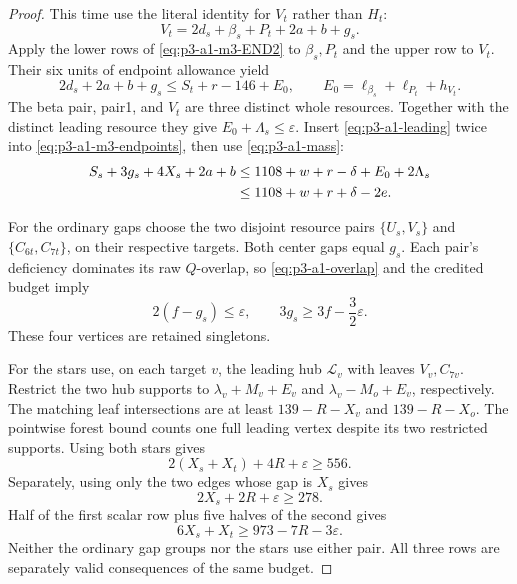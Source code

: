 \documentclass[11pt,letterpaper]{article}
\theoremstyle{definition}\newtheorem{definition}[theorem]{Definition}
\begin{document}
\begin{proof}
This time use the literal identity for $V_t$ rather than $H_t$:
\begin{equation}\label{eq:p3-a1-m3-V-identity}
 V_t=2d_s+\beta_s+P_t+2a+b+g_s.
\end{equation}
Apply the lower rows of \eqref{eq:p3-a1-m3-END2} to $\beta_s,P_t$
and the upper row to $V_t$. Their six units of endpoint allowance
yield
\begin{equation}\label{eq:p3-a1-m3-endpoints}
 2d_s+2a+b+g_s\le S_t+r-146+E_0,\qquad
 E_0=\ell_{\beta_s}+\ell_{P_t}+h_{V_t}.
\end{equation}
The beta pair, pair1, and $V_t$ are three distinct whole resources.
Together with the distinct leading resource they give
$E_0+\Lambda_s\le\varepsilon$.
Insert \eqref{eq:p3-a1-leading} twice into
\eqref{eq:p3-a1-m3-endpoints}, then use \eqref{eq:p3-a1-mass}:
\begin{align}
 S_s+3g_s+4X_s+2a+b
 &\le1108+w+r-\delta+E_0+2\Lambda_s\notag\\
 &\le1108+w+r+\delta-2e.
 \label{eq:p3-a1-m3-transport}
\end{align}

For the ordinary gaps choose the two disjoint resource pairs
$\{U_s,V_s\}$ and $\{C_{6t},C_{7t}\}$, on their respective targets.
Both center gaps equal $g_s$. Each pair's deficiency dominates its
raw $Q$-overlap, so \eqref{eq:p3-a1-overlap} and the credited budget
imply
\begin{equation}\label{eq:p3-a1-m3-gap}
 2(f-g_s)\le\varepsilon,\qquad
 3g_s\ge3f-\frac32\varepsilon.
\end{equation}
These four vertices are retained singletons.

For the stars use, on each target $v$, the leading hub
$\mathcal L_v$ with leaves $V_v,C_{7v}$. Restrict the two hub supports
to $\lambda_v+M_v+E_v$ and $\lambda_v-M_o+E_v$, respectively.
The matching leaf intersections are at least $139-R-X_v$ and
$139-R-X_o$. The pointwise forest bound counts one full leading
vertex despite its two restricted supports. Using both stars gives
\[
 2(X_s+X_t)+4R+\varepsilon\ge556.
\]
Separately, using only the two edges whose gap is $X_s$ gives
\[
 2X_s+2R+\varepsilon\ge278.
\]
Half of the first scalar row plus five halves of the second gives
\begin{equation}\label{eq:p3-a1-m3-star}
 6X_s+X_t\ge973-7R-3\varepsilon.
\end{equation}
Neither the ordinary gap groups nor the stars use either pair. All
three rows are separately valid consequences of the same budget.


\end{proof}
\end{document}
